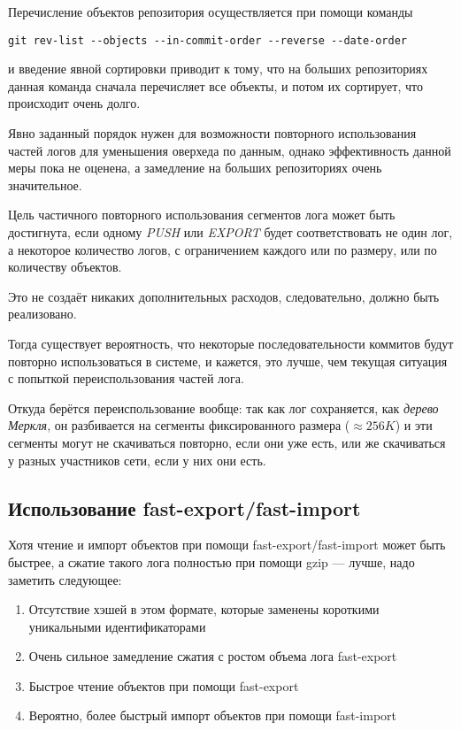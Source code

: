 \documentclass[11pt,a4paper]{article}
\newcommand{\term}[2]{\textit{#2}}
\begin{document}
Перечисление объектов репозитория осуществляется при помощи команды

\begin{verbatim}
git rev-list --objects --in-commit-order --reverse --date-order
\end{verbatim}

и введение явной сортировки приводит к тому, что на больших репозиториях
данная команда сначала перечисляет все объекты, и потом их сортирует, что
происходит очень долго.

Явно заданный порядок нужен для возможности повторного использования
частей логов для уменьшения оверхеда по данным, однако эффективность
данной меры пока не оценена, а замедление на больших репозиториях очень
значительное.

Цель частичного повторного использования сегментов лога может быть
достигнута, если одному \term{PUSH}{PUSH} или \term{EXPORT}{EXPORT} будет
соответствовать не один лог, а некоторое количество логов, с ограничением
каждого или по размеру, или по количеству объектов.

Это не создаёт никаких дополнительных расходов, следовательно, должно
быть реализовано.

Тогда существует вероятность, что некоторые последовательности коммитов
будут повторно использоваться в системе, и кажется, это лучше, чем текущая
ситуация с попыткой переиспользования частей лога.

Откуда берётся переиспользование вообще: так как лог сохраняется, как
\term{merkle}{дерево Меркля}, он разбивается на сегменты фиксированного
размера ($\approx{}256K$) и эти сегменты могут не скачиваться повторно, если они
уже есть, или же скачиваться у разных участников сети, если у них они
есть.

\subsection*{Использование fast-export/fast-import}

Хотя чтение и импорт объектов при помощи fast-export/fast-import
может быть быстрее, а сжатие такого лога полностью при помощи
gzip --- лучше, надо заметить следующее:

\begin{enumerate}
  \item Отсутствие хэшей в этом формате,
        которые заменены короткими уникальными идентификаторами
  \item Очень сильное замедление сжатия с ростом объема лога fast-export
  \item Быстрое чтение объектов при помощи fast-export
  \item Вероятно, более быстрый импорт объектов при помощи fast-import
\end{enumerate}
\end{document}
